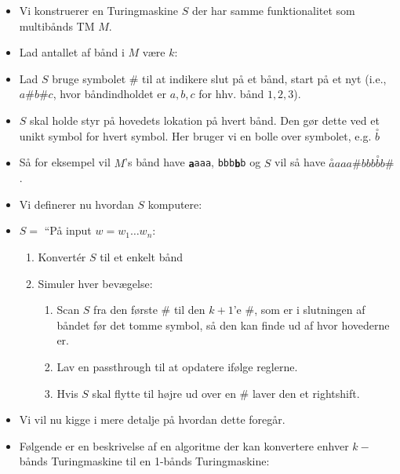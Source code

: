 \begin{frame}[allowframebreaks]
  \begin{itemize}
\item Vi konstruerer en Turingmaskine $S$ der har samme funktionalitet som multibånds TM $M$.
    \item Lad antallet af bånd i $M$ være $k$:
    \item Lad $S$ bruge symbolet $\#$ til at indikere slut på et bånd, start på et nyt (i.e., $a\#b\#c$, hvor båndindholdet er $a,b,c$ for hhv. bånd $1,2,3$).
    \item $S$ skal holde styr på hovedets lokation på hvert bånd. Den gør dette ved et unikt symbol for hvert symbol. Her bruger vi en bolle over symbolet, e.g. $\overset{\circ}{b}$
    \item Så for eksempel vil $M$'s bånd have \texttt{\textbf{a}aaa}, \texttt{bbb\textbf{b}b} og $S$ vil så have $\overset{\circ}{a}aaa\#bbb\overset{\circ}{b}b\#$.
    \item Vi definerer nu hvordan $S$ komputere:
    \item $S = $ ``På input $w = w_{1} \ldots w_{n}$: \begin{enumerate}
                                                   \item Konvertér $S$ til et enkelt bånd
                                                   \item Simuler hver bevægelse:
                                                         \begin{enumerate}
                                                           \item Scan $S$ fra den første $\#$ til den $k+1$'e $\#$, som er i slutningen af båndet før det tomme symbol, så den kan finde ud af hvor hovederne er.
                                                           \item Lav en passthrough til at opdatere ifølge reglerne.
                                                           \item Hvis $S$ skal flytte til højre ud over en $\#$ laver den et rightshift.
                                                         \end{enumerate}
                                                 \end{enumerate}
\begin{itemize}
\end{itemize}
  \item Vi vil nu kigge i mere detalje på hvordan dette foregår.
  \item Følgende er en beskrivelse af en algoritme der kan konvertere enhver $k-$bånds Turingmaskine til en 1-bånds Turingmaskine:

\end{itemize}
\end{frame}
